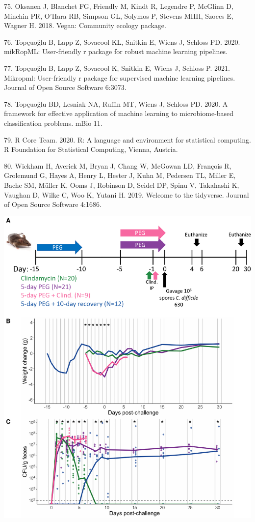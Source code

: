 \documentclass[
  11pt,
]{article}
\begin{document}
\leavevmode\hypertarget{ref-Vegan2018}{}%
75. Oksanen J, Blanchet FG, Friendly M, Kindt R, Legendre P, McGlinn D,
Minchin PR, O'Hara RB, Simpson GL, Solymos P, Stevens MHH, Szoecs E,
Wagner H. 2018. Vegan: Community ecology package.

\leavevmode\hypertarget{ref-mikropml}{}%
76. Topçuoğlu B, Lapp Z, Sovacool KL, Snitkin E, Wiens J, Schloss PD.
2020. mikRopML: User-friendly r package for robust machine learning
pipelines.

\leavevmode\hypertarget{ref-Topcuoglu2021}{}%
77. Topçuoğlu B, Lapp Z, Sovacool K, Snitkin E, Wiens J, Schloss P.
2021. Mikropml: User-friendly r package for supervised machine learning
pipelines. Journal of Open Source Software 6:3073.

\leavevmode\hypertarget{ref-Topcuoglu2020}{}%
78. Topçuoğlu BD, Lesniak NA, Ruffin MT, Wiens J, Schloss PD. 2020. A
framework for effective application of machine learning to
microbiome-based classification problems. mBio 11.

\leavevmode\hypertarget{ref-r_citation_2020}{}%
79. R Core Team. 2020. R: A language and environment for statistical
computing. R Foundation for Statistical Computing, Vienna, Austria.

\leavevmode\hypertarget{ref-Tidyverse2019}{}%
80. Wickham H, Averick M, Bryan J, Chang W, McGowan LD, François R,
Grolemund G, Hayes A, Henry L, Hester J, Kuhn M, Pedersen TL, Miller E,
Bache SM, Müller K, Ooms J, Robinson D, Seidel DP, Spinu V, Takahashi K,
Vaughan D, Wilke C, Woo K, Yutani H. 2019. Welcome to the tidyverse.
Journal of Open Source Software 4:1686.

\newpage

\includegraphics{figure_1.pdf}
\end{document}
